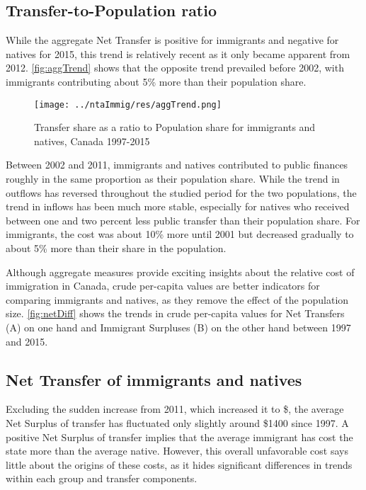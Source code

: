 \subsection{Transfer-to-Population ratio}
While the aggregate Net Transfer is positive for immigrants and negative for natives for 2015, this trend is relatively recent as it only became apparent from 2012.
\autoref{fig:aggTrend} shows that the opposite trend prevailed before 2002, with immigrants contributing about 5\% more than their population share.

\begin{figure}[H]%
  \caption{Transfer share as a ratio to Population share for immigrants and natives, Canada 1997-2015}
  \texttt{[image: ../ntaImmig/res/aggTrend.png]}%
  \label{fig:aggTrend}%
\end{figure}%

Between 2002 and 2011, immigrants and natives contributed to public finances roughly in the same proportion as their population share.
While the trend in outflows has reversed throughout the studied period for the two populations, the trend in inflows has been much more stable, especially for natives who received between one and two percent less public transfer than their population share.
For immigrants, the cost was about 10\% more until 2001 but decreased gradually to about 5\% more than their share in the population.

\vspace{0.7em}\par
Although aggregate measures provide exciting insights about the relative cost of immigration in Canada, crude per-capita values are better indicators for comparing immigrants and natives, as they remove the effect of the population size. \autoref{fig:netDiff} shows the trends in crude per-capita values for Net Transfers (A) on one hand and Immigrant Surpluses (B) on the other hand between 1997 and 2015.

\subsection{Net Transfer of immigrants and natives}
Excluding the sudden increase from 2011, which increased it to \$, the average Net Surplus of transfer has fluctuated only slightly around \$\num{1400} since 1997.
A positive Net Surplus of transfer implies that the average immigrant has cost the state more than the average native.
However, this overall unfavorable cost says little about the origins of these costs, as it hides significant differences in trends within each group and transfer components.

